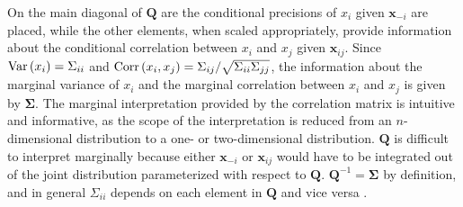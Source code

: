 On the main diagonal of $\pmb{Q}$ are the conditional precisions of $x_i$ given $\pmb{x}_{-i}$ are placed, while the other elements, when scaled appropriately, provide information about the conditional correlation between $x_i$ and $x_j$ given $\pmb{x}_{ij}$. Since $\hbox{Var}\left(x_i\right)=\Sigma_{ii}$ and $\hbox{Corr}\left(x_i,x_j\right)=\Sigma_{ij}/\sqrt{\Sigma_{ii}\Sigma_{jj}}$, the information about the marginal variance of $x_i$ and the marginal correlation between $x_i$ and $x_j$ is given by $\pmb{\Sigma}$. The marginal interpretation provided by the correlation matrix is intuitive and informative, as the scope of the interpretation is reduced from an $n$-dimensional distribution to a one- or two-dimensional distribution. $\pmb{Q}$ is difficult to interpret marginally because either $\pmb{x}_{-i}$ or $\pmb{x}_{ij}$ would have to be integrated out of the joint distribution parameterized with respect to $\pmb{Q}$. $\pmb{Q}^{-1}=\pmb{\Sigma}$ by definition, and in general $\Sigma_{ii}$ depends on each element in $\pmb{Q}$ and vice versa \autocite[][20--23]{rue2005gaussian}.
